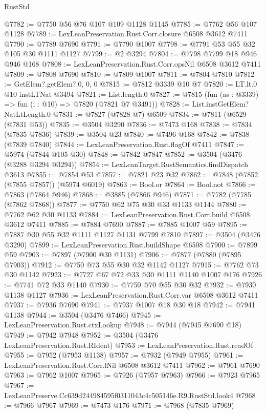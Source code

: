 \begin{lexlean}{RustStd}
\begin{coremodule}
@7782 := @7750 @56 @76 @107 @109 @1128 @1145
@7785 := @7762 @56 @107 @1128
@7789 := LexLeanPreservation.Rust.Corr.closure @6508 @3612 @7411
@7790 := @7789 @7690
@7791 := @7790 @1007
@7798 := @7791 @53 @55 @32 @105 @30 @1111 @1127
@7799 := @2 @3294
@7804 := @7798 @7799 @18 @946 @946 @168
@7808 := LexLeanPreservation.Rust.Corr.opsNil @6508 @3612 @7411
@7809 := @7808 @7690
@7810 := @7809 @1007
@7811 := @7804 @7810
@7812 := GetElem?.getElem?.{0, 0, 0}
@7815 := @7812 @3339 @10 @7
@7820 := LT.lt.{0} @10 instLTNat @3494
@7821 := List.length.{0}
@7827 := @7815 (fun (as : @3339) => fun (i : @10) => @7820 (@7821 @7 @3491))
@7828 := List.instGetElem?NatLtLength.{0}
@7831 := @7827 (@7828 @7) @6509
@7834 := @7811 (@6529 (@7831 @53))
@7835 := @3504 @3290
@7836 := @7473 @168
@7838 := @7834 (@7835 @7836)
@7839 := @3504 @23
@7840 := @7496 @168
@7842 := @7838 (@7839 @7840)
@7844 := LexLeanPreservation.Rust.flagOf @7411
@7847 := @5974 (@7844 @105 @30)
@7848 := @7842 @7847
@7852 := @3504 (@3476 (@3288 @3294 @3294))
@7854 := LexLeanTarget.RustSemantics.findDispatch @3613
@7855 := @7854 @53
@7857 := @7821 @23 @32
@7862 := @7848 (@7852 (@7855 @7857)) (@5974 @6019)
@7863 := Bool.or
@7864 := Bool.not
@7866 := @7863 (@7864 @946)
@7868 := @3885 (@7866 @946)
@7871 := @7782 (@7785 (@7862 @7868))
@7877 := @7750 @62 @75 @30 @33 @1133 @1144
@7880 := @7762 @62 @30 @1133
@7884 := LexLeanPreservation.Rust.Corr.build @6508 @3612 @7411
@7885 := @7884 @7690
@7887 := @7885 @1007 @59
@7895 := @7887 @30 @55 @32 @1111 @1127 @1131 @7799 @7810
@7897 := @3504 (@3476 @3290)
@7899 := LexLeanPreservation.Rust.buildShape @6508
@7900 := @7899 @59
@7903 := @7897 (@7900 @30 @1131)
@7906 := @7877 (@7880 (@7895 @7903))
@7912 := @7750 @73 @55 @30 @32 @1142 @1127
@7915 := @7762 @73 @30 @1142
@7923 := @7727 @67 @72 @33 @30 @1111 @1140 @1007 @176
@7926 := @7741 @72 @33 @1140
@7930 := @7750 @70 @55 @30 @32
@7932 := @7930 @1138 @1127
@7936 := LexLeanPreservation.Rust.Corr.var @6508 @3612 @7411
@7937 := @7936 @7690
@7941 := @7937 @1007 @18 @30 @18
@7942 := @7941 @1138
@7944 := @3504 (@3476 @7466)
@7945 := LexLeanPreservation.Rust.ctxLookup
@7948 := @7944 (@7945 @7690 @18)
@7949 := @7942 @7948
@7952 := @3504 (@3476 LexLeanPreservation.Rust.RIdent)
@7953 := LexLeanPreservation.Rust.readOf
@7955 := @7952 (@7953 @1138)
@7957 := @7932 (@7949 @7955)
@7961 := LexLeanPreservation.Rust.Corr.lNil @6508 @3612 @7411
@7962 := @7961 @7690
@7963 := @7962 @1007
@7965 := @7926 (@7957 @7963)
@7966 := @7923 @7965
@7967 := LexLeanPreserve.Cc639d244984595f0311043c4c505146e.R9.RustStd.look4
@7968 := @7966 @7967
@7969 := @7473 @176
@7971 := @7968 (@7835 @7969)

\end{coremodule}
\end{lexlean}
